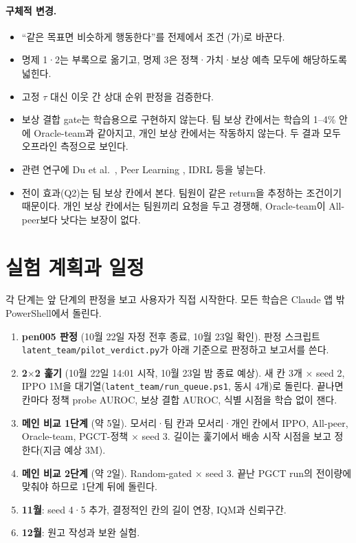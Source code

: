 \documentclass[11pt]{article}
\begin{document}
\paragraph{구체적 변경.}
\begin{itemize}
  \item ``같은 목표면 비슷하게 행동한다''를 전제에서 조건 (가)로 바꾼다.
  \item 명제 1·2는 부록으로 옮기고, 명제 3은 정책·가치·보상 예측 모두에 해당하도록 넓힌다.
  \item 고정 $\tau$ 대신 이웃 간 상대 순위 판정을 검증한다.
  \item 보상 결합 gate는 학습용으로 구현하지 않는다. 팀 보상 칸에서는 학습의 1--4\% 안에 Oracle-team과 같아지고, 개인 보상 칸에서는 작동하지 않는다. 두 결과 모두 오프라인 측정으로 보인다.
  \item 관련 연구에 Du et al.\ \cite{du2025}, Peer Learning \cite{derstroff2024}, IDRL \cite{idrl} 등을 넣는다.
  \item 전이 효과(Q2)는 팀 보상 칸에서 본다. 팀원이 같은 return을 추정하는 조건이기 때문이다. 개인 보상 칸에서는 팀원끼리 요청을 두고 경쟁해, Oracle-team이 All-peer보다 낫다는 보장이 없다.
\end{itemize}

\section{실험 계획과 일정}

각 단계는 앞 단계의 판정을 보고 사용자가 직접 시작한다. 모든 학습은 Claude 앱 밖 PowerShell에서 돌린다.
\begin{enumerate}
  \item \textbf{pen005 판정} (10월 22일 자정 전후 종료, 10월 23일 확인). 판정 스크립트 \texttt{latent\_team/pilot\_verdict.py}가 아래 기준으로 판정하고 보고서를 쓴다.
  \item \textbf{2$\times$2 훑기} (10월 22일 14:01 시작, 10월 23일 밤 종료 예상). 새 칸 3개 $\times$ seed 2, IPPO 1M을 대기열(\texttt{latent\_team/run\_queue.ps1}, 동시 4개)로 돌린다. 끝나면 칸마다 정책 probe AUROC, 보상 결합 AUROC, 식별 시점을 학습 없이 잰다.
  \item \textbf{메인 비교 1단계} (약 5일). 모서리·팀 칸과 모서리·개인 칸에서 IPPO, All-peer, Oracle-team, PGCT-정책 $\times$ seed 3. 길이는 훑기에서 배송 시작 시점을 보고 정한다(지금 예상 3M).
  \item \textbf{메인 비교 2단계} (약 2일). Random-gated $\times$ seed 3. 끝난 PGCT run의 전이량에 맞춰야 하므로 1단계 뒤에 돌린다.
  \item \textbf{11월}: seed 4·5 추가, 결정적인 칸의 길이 연장, IQM과 신뢰구간.
  \item \textbf{12월}: 원고 작성과 보완 실험.
\end{enumerate}
\end{document}

